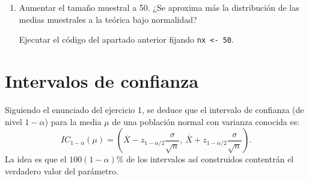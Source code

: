 \documentclass[
]{book}
\theoremstyle{break}
\theoremstyle{definition}
\theoremstyle{definition}
\theoremstyle{definition}
\theoremstyle{remark}
\let\BeginKnitrBlock\begin \let\EndKnitrBlock\end
\begin{document}
\vspace{0.5cm}

\begin{enumerate}
\def\labelenumi{\alph{enumi})}
\setcounter{enumi}{1}
\item
  Aumentar el tamaño muestral a 50. ¿Se aproxima más la
  distribución de las medias muestrales a la teórica bajo
  normalidad?

  Ejecutar el código del apartado anterior fijando \texttt{nx\ \textless{}-\ 50}.
\end{enumerate}

\hypertarget{intervalos-de-confianza}{%
\section{Intervalos de confianza}\label{intervalos-de-confianza}}

\BeginKnitrBlock{exercise}
\protect\hypertarget{exr:unnamed-chunk-13}{}{\label{exr:unnamed-chunk-13} }
\EndKnitrBlock{exercise}

Siguiendo el enunciado del ejercicio 1, se deduce que el intervalo de
confianza (de nivel \(1-\alpha\)) para la media \(\mu\) de una población
normal con varianza conocida es:
\[IC_{1-\alpha}\left(  \mu\right)  = 
\left(  \overline{X}-z_{1-\alpha/2}\dfrac{\sigma}{\sqrt{n}},\ \overline{X} 
+ z_{1-\alpha/2}\dfrac{\sigma}{\sqrt{n}} \right).\]
La idea es que el \(100(1-\alpha)\%\) de los intervalos así
construidos contentrán el verdadero valor del parámetro.
\end{document}

